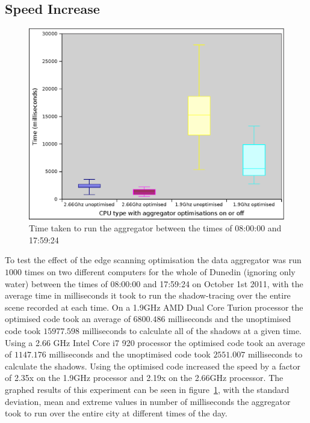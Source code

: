 \documentclass[12pt]{report}
\begin{document}
\subsection{Speed Increase}
\begin{figure}[h]
\centering
\includegraphics[width=\textwidth]{aggregator-optimisations-graph.eps}
\caption{Time taken to run the aggregator between the times of 08:00:00 and 17:59:24}
\label{image:aggregator-optimisations-graph}
\end{figure}

To test the effect of the edge scanning optimisation the data aggregator was run $1000$ times on two different computers for the whole of Dunedin (ignoring only water) between the times of 08:00:00 and 17:59:24 on October 1st 2011, with the average time in milliseconds it took to run the shadow-tracing over the entire scene recorded at each time. On a 1.9GHz AMD Dual Core Turion processor the optimised code took an average of $6800.486$ milliseconds and the unoptimised code took $15977.598$ milliseconds to calculate all of the shadows at a given time. Using a 2.66 GHz Intel Core i7 920 processor the optimised code took an average of $1147.176$ milliseconds and the unoptimised code took $2551.007$ milliseconds to calculate the shadows. Using the optimised code increased the speed by a factor of 2.35x on the 1.9GHz processor and 2.19x on the 2.66GHz processor. The graphed results of this experiment can be seen in figure~\ref{image:aggregator-optimisations-graph}, with the standard deviation, mean and extreme values in number of milliseconds the aggregator took to run over the entire city at different times of the day.
\end{document}
